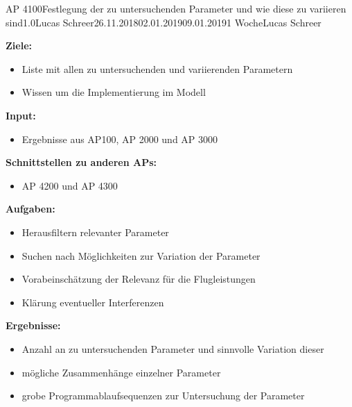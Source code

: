 \clearpage
\begin{wpd}{AP 4100}{Festlegung der zu untersuchenden Parameter und wie diese zu variieren sind}{1.0}{Lucas Schreer}{26.11.2018}{02.01.2019}{09.01.2019}{1 Woche}{Lucas Schreer}
    {
    \textbf{Ziele:}
    \begin{itemize}
        \item Liste mit allen zu untersuchenden und variierenden Parametern
        \item Wissen um die Implementierung im Modell
    \end{itemize}
    \textbf{Input:}
    \begin{itemize}
        \item Ergebnisse aus AP100, AP 2000 und AP 3000
    \end{itemize}
    \textbf{Schnittstellen zu anderen APs:}
    \begin{itemize}
        \item AP 4200 und AP 4300
    \end{itemize}
    \textbf{Aufgaben:}
    \begin{itemize}
        \item Herausfiltern relevanter Parameter
        \item Suchen nach Möglichkeiten zur Variation der Parameter
        \item Vorabeinschätzung der Relevanz für die Flugleistungen
        \item Klärung eventueller Interferenzen
    \end{itemize}
    \textbf{Ergebnisse:}
    \begin{itemize}
        \item Anzahl an zu untersuchenden Parameter und sinnvolle Variation dieser
        \item mögliche Zusammenhänge einzelner Parameter
        \item grobe Programmablaufsequenzen zur Untersuchung der Parameter 
    \end{itemize}
    }
\end{wpd}


